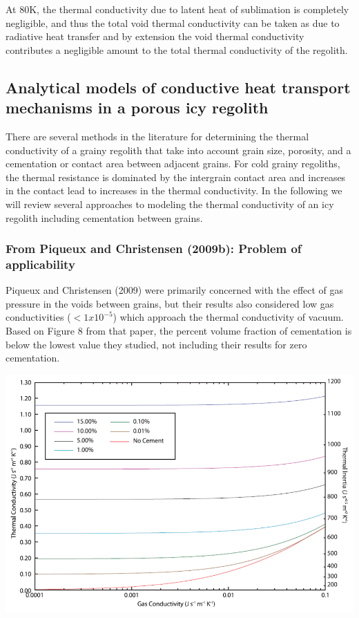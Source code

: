 \documentclass[11pt]{article} %
\begin{document}
	At 80K, the thermal conductivity due to latent heat of sublimation is completely negligible, and thus the total void thermal conductivity can be taken as due to radiative heat transfer and by extension the void thermal conductivity contributes a negligible amount to the total thermal conductivity of the regolith. 

\subsection{Analytical models of conductive heat transport mechanisms in a porous icy regolith}
	There are several methods in the literature for determining the thermal conductivity of a grainy regolith that take into account grain size, porosity, and a cementation or contact area between adjacent grains. For cold grainy regoliths, the thermal resistance is dominated by the intergrain contact area and increases in the contact lead to increases in the thermal conductivity. In the following we will review several approaches to modeling the thermal conductivity of an icy regolith including cementation between grains.

\subsubsection{From Piqueux and Christensen (2009b): Problem of applicability}

	 Piqueux and Christensen (2009) were primarily concerned with the effect of gas pressure in the voids between grains, but their results also considered low gas conductivities ($<1x10^{-5}$) which approach the thermal conductivity of vacuum. Based on Figure 8 from that paper, the percent volume fraction of cementation is below the lowest value they studied, not including their results for zero cementation. 

	 \includegraphics[scale=0.5]{PandQ2009b_CementVolumeFraction.png}
\end{document}

